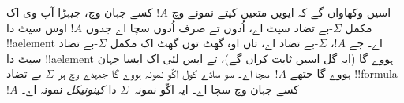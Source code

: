 \documentclass[../../../include/open-logic-section]{subfiles}
\begin{document}
اسیں وکھاواں گے کہ ایویں متعین کیتے نمونے وچ $!A$ کسے جہان وچ، جیہڑا آپ وی اک مکمل $\Sigma$-بے تضاد سیٹ اے، اُدوں تے صرف اُدوں سچا اے جدوں $!A$ اوس سیٹ دا !!a{element} اے۔ جے $!A$، $\Sigma$-بے تضاد اے، تاں اوہ گھٹ توں گھٹ اک مکمل $\Sigma$-بے تضاد سیٹ دا !!a{element} ہووے گا (ایہ گل اسیں ثابت کراں گے)، تے ایس لئی اک ایسا جہان ہووے گا جتھے $!A$~سچا اے۔ سو ساڈے کول اکّو نمونہ ہووے گا جیہدے وچ ہر $\Sigma$-بے تضاد !!{formula}~$!A$ کسے جہان وچ سچا اے۔ ایہ اکّو نمونہ~$\Sigma$ دا \emph{کینونیکل} نمونہ اے۔
\end{document}
